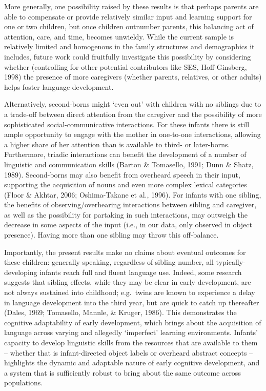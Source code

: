 \documentclass[
  man,floatsintext]{apa6}
\begin{document}
More generally, one possibility raised by these results is that perhaps parents are able to compensate or provide relatively similar input and learning support for one or two children, but once children outnumber parents, this balancing act of attention, care, and time, becomes unwieldy. While the current sample is relatively limited and homogenous in the family structures and demographics it includes, future work could fruitfully investigate this possibility by considering whether (controlling for other potential contributors like SES, Hoff-Ginsberg, 1998) the presence of more caregivers (whether parents, relatives, or other adults) helps foster language development.

Alternatively, second-borns might `even out' with children with no siblings due to a trade-off between direct attention from the caregiver and the possibility of more sophisticated social-communicative interactions. For these infants there is still ample opportunity to engage with the mother in one-to-one interactions, allowing a higher share of her attention than is available to third- or later-borns. Furthermore, triadic interactions can benefit the development of a number of linguistic and communication skills (Barton \& Tomasello, 1991; Dunn \& Shatz, 1989). Second-borns may also benefit from overheard speech in their input, supporting the acquisition of nouns and even more complex lexical categories (Floor \& Akhtar, 2006; Oshima-Takane et al., 1996). For infants with one sibling, the benefits of observing/overhearing interactions between sibling and caregiver, as well as the possibility for partaking in such interactions, may outweigh the decrease in some aspects of the input (i.e., in our data, only observed in object presence). Having more than one sibling may throw this off-balance.

Importantly, the present results make no claims about eventual outcomes for these children: generally speaking, regardless of sibling number, all typically-developing infants reach full and fluent language use. Indeed, some research suggests that sibling effects, while they may be clear in early development, are not always sustained into childhood; e.g.~twins are known to experience a delay in language development into the third year, but are quick to catch up thereafter (Dales, 1969; Tomasello, Mannle, \& Kruger, 1986). This demonstrates the cognitive adaptability of early development, which brings about the acquisition of language across varying and allegedly `imperfect' learning environments. Infants' capacity to develop linguistic skills from the resources that are available to them -- whether that is infant-directed object labels or overheard abstract concepts -- highlights the dynamic and adaptable nature of early cognitive development, and a system that is sufficiently robust to bring about the same outcome across populations.
\end{document}
